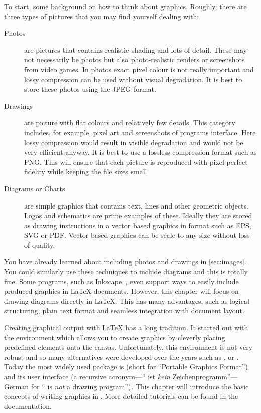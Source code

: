 To start, some background on how to think about graphics.
Roughly, there are three types of pictures that you may find yourself
dealing with:
\begin{description}
  \item[Photos] are pictures that contains realistic shading and lots of
    detail. These may not necessarily be photos but also photo-realistic
    renders or screenshots from video games. In photos exact pixel colour is
    not really important and lossy compression can be used without visual
    degradation. It is best to store these photos using the JPEG format.
  \item[Drawings] are picture with flat colours and relatively few details.
    This category includes, for example,  pixel art and screenshots of programs
    interface. Here lossy compression would result in visible degradation and
    would not be very efficient anyway. It is best to use a lossless compression
    format such as PNG\@. This will ensure that each picture is reproduced with
    pixel-perfect fidelity while keeping the file sizes small.
  \item[Diagrams or Charts] are simple graphics that contains text, lines and other
    geometric objects. Logos and schematics are prime examples of these.
    Ideally they are stored as drawing instructions in a vector based graphics in format such
    as EPS, SVG or PDF\@. Vector based graphics can be scale to any size without loss of quality.
\end{description}

You have already learned about including photos and drawings in
\autoref{sec:images}. You could similarly use these techniques to include
diagrams and this is totally fine. Some programs, such as
Inkscape~\cite{inkscape}, even support ways to easily include produced graphics
in \LaTeX{} documents. However, this chapter will focus on drawing diagrams
directly in \LaTeX{}. This has many advantages, such as logical structuring,
plain text format and seamless integration with document layout.

Creating graphical output with \LaTeX{} has a long tradition. It started out
with the  environment which allows you to create graphics by
cleverly placing predefined elements onto the canvas. Unfortunately, this
environment is not very robust and so many alternatives were developed over the
years such as ,  or . Today the most
widely used package is  (short for \enquote{Portable Graphics
  Format}) and its user interface \TikZ{} (a recursive acronym---\enquote{\TikZ{}
  ist \textit{kein} Zeichenprogramm}---German for \enquote{\TikZ{} is
  \textit{not} a drawing program}). This chapter will introduce the basic
concepts of writing graphics in \TikZ{}. More detailed tutorials can be found
in the  documentation.

